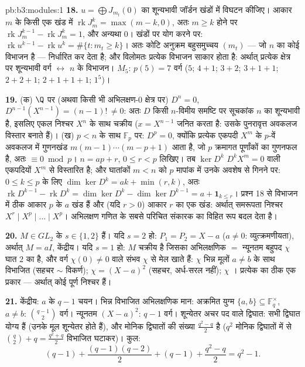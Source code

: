 \begin{solution}{pb:b3:modules:1}
\textbf{18.} $u = \bigoplus J_{m_t}(0)$ का शून्यभावी जॉर्डन खंडों में विघटन कीजिए। आकार
$m$ के किसी एक खंड में $\operatorname{rk}J_m^k = \max(m - k, 0)$, अतः $m
\geq k$ होने पर $\operatorname{rk}J_m^{k-1} - \operatorname{rk}J_m^k = 1$, और अन्यथा
$0$। खंडों पर योग करने पर: $\operatorname{rk}u^{k-1} - \operatorname{rk}u^k =
\#\{t : m_t \geq k\}$। अतः कोटि अनुक्रम बहुसमुच्चय
$(m_t)$ --- जो $n$ का कोई विभाजन है --- निर्धारित कर देता है; और
विलोमतः प्रत्येक विभाजन साकार होता है: अर्थात् प्रत्येक क्षेत्र पर
शून्यभावी वर्ग $\leftrightarrow$ $n$ के विभाजन। $M_5$: $p(5) = 7$ वर्ग ($5$;
$4{+}1$; $3{+}2$; $3{+}1{+}1$; $2{+}2{+}1$; $2{+}1{+}1{+}1$; $1^5$)।

\textbf{19.} (क) $\Q$ पर (अथवा किसी भी अभिलक्षण-$0$ क्षेत्र पर)
$D^n = 0$, $D^{n-1}(X^{n-1}) = (n-1)!\, \neq 0$: अतः $D$ किसी $n$-विमीय समष्टि पर सूचकांक $n$ का
शून्यभावी है, इसलिए एकल निश्चर $X^n$ के साथ चक्रीय ($x = X^{n-1}$ जनित करता
है: उसके पुनरावृत्त अवकलज विस्तार बनाते हैं)। (ख) $p
< n$ के साथ $\mathbb F_p$
पर: $D^p = 0$, क्योंकि प्रत्येक एकपदी $X^m$ के $p$-वें अवकलज में
गुणनखंड $m(m-1)\cdots(m-p+1)$ आता है, जो $p$ क्रमागत पूर्णांकों का गुणनफल है, अतः
$\equiv 0 \bmod p$। $n = ap + r$, $0 \leq r < p$ लिखिए। तब $\ker D^k$ $D^kX^m = 0$ वाली एकपदियों $X^m$ से
विस्तारित है; और घातांकों $m < n$ को $p$ मापांक में उनके अवशेष से
गिनने पर: $0 \leq k \leq p$ के लिए $\dim\ker D^k = ak + \min(r,
k)$, अतः $\operatorname{rk}D^{k-1} -
\operatorname{rk}D^k = \dim\ker D^k - \dim\ker D^{k-1} = a +
\mathbf 1_{k \leq r}$। प्रश्न 18 से विभाजन में
ठीक आकार $p$ के $a$ खंड हैं और (यदि $r > 0$) आकार $r$ का एक
खंड: अर्थात् समरूपता निश्चर $X^r \mid X^p \mid \dots \mid X^p$। अभिलक्षण गणित के सबसे परिचित
संकारक का विहित रूप बदल देता है।

\textbf{20.} $M \in GL_2$ के $s \in \{1, 2\}$  हैं। यदि $s = 2$ हो:
$P_1 = P_2 = X - a$ ($a \neq 0$: व्युत्क्रमणीयता), अर्थात् $M = aI$, केंद्रीय। यदि $s = 1$
हो: $M$ चक्रीय है जिसका अभिलक्षणिक $=$ न्यूनतम बहुपद $\chi$ घात
$2$ का है, और वर्ग $\chi(0) \neq 0$ वाले संभव $\chi$ से मेल खाते हैं: $\chi$
भिन्न मूलों $a \neq
b$ के साथ विभाजित (सहचर $\sim$ विकर्ण); $\chi = (X - a)^2$ (सहचर,
अर्ध-सरल नहीं); $\chi$ । प्रत्येक का ठीक एक प्रकार --- अर्थात्
 कोई पूर्ण निश्चर हैं।

\textbf{21.} केंद्रीय: $a$ के $q - 1$ चयन। भिन्न विभाजित अभिलक्षणिक
मान: अक्रमित युग्म $\{a, b\} \subseteq
\mathbb F_q^\times$, $a \neq b$: $\binom{q-1}2$ वर्ग। न्यूनतम $(X-a)^2$: $q - 1$
वर्ग। शून्येतर अचर पद वाले  द्विघात: सभी  द्विघात
योग्य हैं (उनके मूल शून्येतर होते हैं), और मोनिक  द्विघातों
की संख्या $\frac{q^2 - q}2$ है ($q^2$ मोनिक द्विघातों में से $\binom q2 + q = \frac{q^2+q}2$ विभाजित
घटाकर)। कुल:
\[
(q - 1) + \frac{(q-1)(q-2)}2 + (q - 1) + \frac{q^2 - q}2
= q^2 - 1 .
\]


\end{solution}
